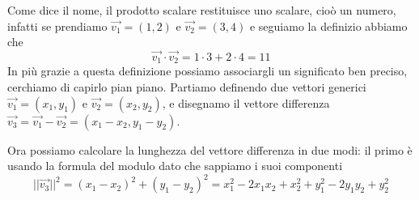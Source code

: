 \documentclass{rapport}
\begin{document}
Come dice il nome, il prodotto scalare restituisce uno scalare, cioò un numero, infatti se prendiamo $\vec{v_1}=(1,2)$ e $\vec{v_2}=(3,4)$ e seguiamo la definizio abbiamo che 
\[
\vec{v_1} \cdot \vec{v_2} = 1\cdot 3 + 2\cdot 4 = 11  
\]
In più grazie a questa definizione possiamo associargli un significato ben preciso, cerchiamo di capirlo pian piano. Partiamo definendo due vettori generici $\vec{v_1}=(x_1,y_1)$ e $\vec{v_2}=(x_2,y_2)$, e disegnamo il vettore differenza $\vec{v_3} = \vec{v_1}-\vec{v_2}=(x_1-x_2, y_1-y_2)$.  
\begin{figure}[htbp]
    \centering


\end{figure}



Ora possiamo calcolare la lunghezza del vettore differenza in due modi: il primo è usando la formula del modulo dato che sappiamo i suoi componenti
\begin{equation}\label{eq:prod1}  
||\vec{v_3}||^2 = (x_1-x_2)^2+(y_1-y_2)^2 = x_1^2 -2x_1x_2 + x_2^2 + y_1^2-2y_1y_2 +y_2^2 
\end{equation}
\end{document}
